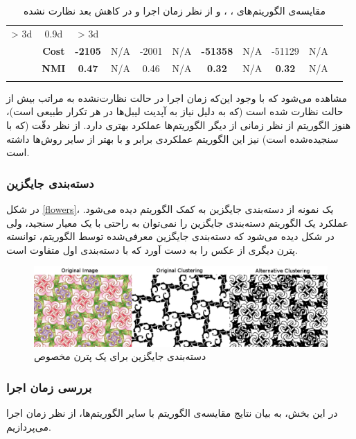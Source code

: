 \begin{table}[h]
\begin{latin}
\begin{tabular}{|cc|c|c|c|c|c|c|c|c|c|}
		> 3d &
		0.9d &
		> 3d \\
		&
		\textbf{Cost} & 
		\textbf{-2105} &
		N/A &
		-2001 &
		N/A &
		\textbf{-51358} &
		N/A &
		-51129 &
		N/A \\
		&
		\textbf{NMI} & 
		\textbf{0.47} &
		N/A &
		0.46 &
		N/A &
		\textbf{0.32} &
		N/A &
		\textbf{0.32} &
		N/A \\
		\Xhline{2\arrayrulewidth}
	\end{tabular}
	\end{latin}
	\caption{مقایسه‌ی الگوریتم‌های 
		،
		،
		و
		از نظر زمان اجرا و 
		 در کاهش بعد نظارت‌ نشده}
	\label{unsup}
\end{table}

مشاهده می‌شود که با وجود این‌که زمان اجرا در حالت نظارت‌نشده به مراتب بیش از حالت نظارت شده است (که به دلیل نیاز به آپدیت لیبل‌ها در هر تکرار طبیعی است)، هنوز الگوریتم
از نظر زمانی از دیگر الگوریتم‌ها عملکرد بهتری دارد. از نظر دقّت  (که با 
سنجیده‌شده است) نیز این الگوریتم عملکردی برابر و با بهتر از سایر رو‌ش‌ها داشته است.


\subsubsection{دسته‌بندی جایگزین}
در شکل 
\eqref{flowers}،
یک نمونه از دسته‌بندی جایگزین به کمک الگوریتم
دیده می‌شود. عملکرد یک الگوریتم دسته‌بندی جایگزین را نمی‌توان به راحتی با یک معیار سنجید، ولی در شکل دیده می‌شود که دسته‌بندی جایگزین معرفی‌شده توسط الگوریتم، توانسته پترن دیگری از عکس را به دست آورد که با دسته‌بندی اول متفاوت است.
\begin{figure}[h!]
\includegraphics[scale=0.4]{./Figures/Etchers_result.png}
\caption{دسته‌بندی جایگزین برای یک پترن مخصوص}
\label{flowers}
\end{figure}

\subsubsection{بررسی زمان اجرا}
در این بخش، به بیان نتایج مقایسه‌ی الگوریتم 
با سایر الگوریتم‌ها، از نظر زمان اجرا می‌پردازیم.

